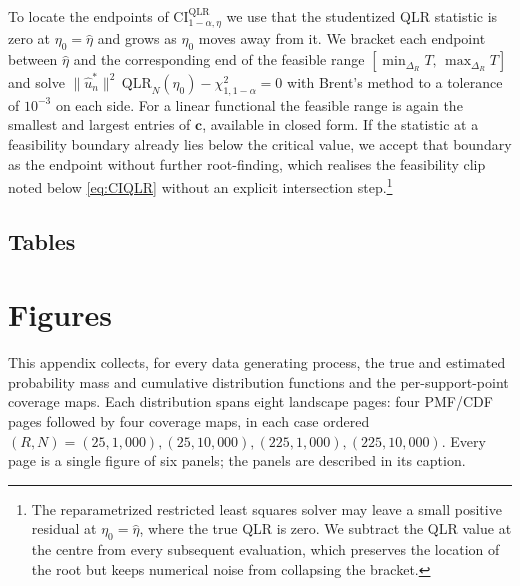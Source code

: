 To locate the endpoints of $\mathrm{CI}^{\mathrm{QLR}}_{1-\alpha,\eta}$ we use that the studentized QLR statistic is zero at $\eta_0 = \hat{\eta}$ and grows as $\eta_0$ moves away from it.
We bracket each endpoint between $\hat{\eta}$ and the corresponding end of the feasible range $[\min_{\Delta_R}T,\,\max_{\Delta_R}T]$ and solve $\|\hat{u}^*_n\|^2\,\mathrm{QLR}_N(\eta_0) - \chi^2_{1,1-\alpha} = 0$ with Brent's method \citep[\texttt{scipy.optimize.brentq}; see][]{Brent1973} to a tolerance of $10^{-3}$ on each side.
For a linear functional the feasible range is again the smallest and largest entries of $\bm{c}$, available in closed form.
If the statistic at a feasibility boundary already lies below the critical value, we accept that boundary as the endpoint without further root-finding, which realises the feasibility clip noted below \cref{eq:CIQLR} without an explicit intersection step.\footnote{The reparametrized restricted least squares solver may leave a small positive residual at $\eta_0 = \hat{\eta}$, where the true QLR is zero. We subtract the QLR value at the centre from every subsequent evaluation, which preserves the location of the root but keeps numerical noise from collapsing the bracket.}

\clearpage
\begin{landscape}
\section{Tables}
\label{sec:app:tab}

\end{landscape}

\clearpage
\section{Figures}
\label{sec:app:fig}
This appendix collects, for every data generating process, the true and
estimated probability mass and cumulative distribution functions and the
per-support-point coverage maps. Each distribution spans eight landscape pages:
four PMF/CDF pages followed by four coverage maps, in each case ordered
$(R,N)=(25,1{,}000),(25,10{,}000),(225,1{,}000),(225,10{,}000)$. Every page is a
single figure of six panels; the panels are described in its caption.

